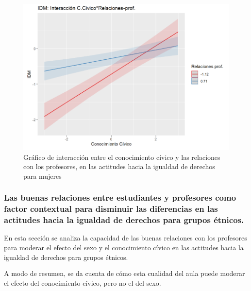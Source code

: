 \documentclass[12pt,twoside]{templates/facsothesis}
\begin{document}
\begin{figure}[H]

{\centering \includegraphics[width=1\linewidth]{input/images/PLOTINT2} 

}

\caption{Gráfico de interacción entre el conocimiento cívico y las relaciones con los profesores, en las actitudes hacia la igualdad de derechos para mujeres}\label{fig:unnamed-chunk-14}
\end{figure}

\hypertarget{las-buenas-relaciones-entre-estudiantes-y-profesores-como-factor-contextual-para-disminuir-las-diferencias-en-las-actitudes-hacia-la-igualdad-de-derechos-para-grupos-uxe9tnicos.}{%
\subsubsection{Las buenas relaciones entre estudiantes y profesores como factor contextual para disminuir las diferencias en las actitudes hacia la igualdad de derechos para grupos étnicos.}\label{las-buenas-relaciones-entre-estudiantes-y-profesores-como-factor-contextual-para-disminuir-las-diferencias-en-las-actitudes-hacia-la-igualdad-de-derechos-para-grupos-uxe9tnicos.}}

En esta sección se analiza la capacidad de las buenas relaciones con los profesores para moderar el efecto del sexo y el conocimiento cívico en las actitudes hacia la igualdad de derechos para grupos étnicos.

A modo de resumen, se da cuenta de cómo esta cualidad del aula puede moderar el efecto del conocimiento cívico, pero no el del sexo.
\end{document}
